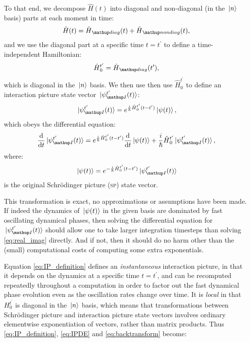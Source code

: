 To that end, we decompose $\hat H(t)$ into diagonal and non-diagonal (in the $\ket{n}$ basis) parts at each moment in time:
\begin{align}
\hat H(t) = \hat H_\up{diag}(t) + \hat H_\up{nondiag}(t),
\end{align}
and we use the diagonal part at a specific time $t=t^\prime$ to define a time-independent Hamiltonian:
\begin{align}\label{eq:H0def}
 \hat H_0^{t^\prime} = \hat H_\up{diag}(t^\prime),
\end{align}
which is diagonal in the $\ket{n}$ basis. We then use then use $\hat H_0^{t^\prime}$ to define an interaction picture state vector $\ket{\psi_\up{I} ^{t^\prime}(t)}$:
\begin{align}\label{eq:IP_definition}
\ket{\psi_\up{I}^{t^\prime}(t)} = e^{\frac i \hbar \hat H_0^{t^\prime}(t - t^\prime)}\ket{\psi(t)},
\end{align}
which obeys the differential equation:
\begin{align}\label{eq:IPDE}
\dv t \ket{\psi_\up{I}^{t^\prime}(t)}
    = e^{\frac i \hbar \hat H_0^{t^\prime}(t - t^\prime)}\dv t \ket{\psi(t)}
      + \frac i\hbar \hat H_0^{t^\prime}\ket{\psi_\up{I}^{t^\prime}(t)},
\end{align}
where:
\begin{align}\label{eq:backtransform}
\ket{\psi(t)} = e^{-\frac i \hbar \hat H_0^{t^\prime}(t - t^\prime)}\ket{\psi_\up{I}^{t^\prime}(t)}
\end{align}
is the original Schrödinger picture (\textsc{sp}) state vector.

This transformation is exact, no approximations or assumptions have been made. If indeed the dynamics of $\ket{\psi(t)}$ in the given basis are dominated by fast oscillating dynamical phases, then solving the differential equation for $\ket{\psi_\up{I}^{t^\prime}(t)}$ should allow one to take larger integration timesteps than solving \eqref{eq:real_imag} directly. And if not, then it should do no harm other than the (small) computational costs of computing some extra exponentials.

Equation \eqref{eq:IP_definition} defines an \emph{instantaneous} interaction picture, in that it depends on the dynamics at a specific time $t=t^\prime$, and can be recomputed repeatedly throughout a computation in order to factor out the fast dynamical phase evolution even as the oscillation rates change over time. It is \emph{local} in that $H_0^{t^\prime}$ is diagonal in the $\ket{n}$ basis, which means that transformations between Schrödinger picture and interaction picture state vectors involves ordinary elementwise exponentiation of vectors, rather than matrix products. Thus \eqref{eq:IP_definition}, \eqref{eq:IPDE} and \eqref{eq:backtransform} become:

